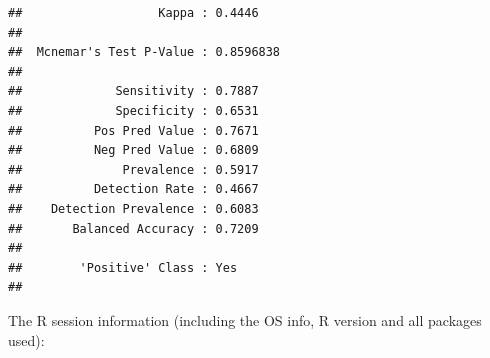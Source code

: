 \documentclass{article}\usepackage[]{graphicx}\usepackage[]{xcolor}
\makeatletter
\newenvironment{kframe}{%
 \def\at@end@of@kframe{}%
 \ifinner\ifhmode%
  \def\at@end@of@kframe{\end{minipage}}%
  \begin{minipage}{\columnwidth}%
 \fi\fi%
 \def\FrameCommand##1{\hskip\@totalleftmargin \hskip-\fboxsep
 \colorbox{shadecolor}{##1}\hskip-\fboxsep
     \hskip-\linewidth \hskip-\@totalleftmargin \hskip\columnwidth}%
 \MakeFramed {\advance\hsize-\width
   \@totalleftmargin\z@ \linewidth\hsize
   \@setminipage}}%
 {\par\unskip\endMakeFramed%
 \at@end@of@kframe}
\newenvironment{knitrout}{}{} %
\makeatother
\begin{document}
\begin{knitrout}
\begin{kframe}
\begin{verbatim}
##                   Kappa : 0.4446          
##                                           
##  Mcnemar's Test P-Value : 0.8596838       
##                                           
##             Sensitivity : 0.7887          
##             Specificity : 0.6531          
##          Pos Pred Value : 0.7671          
##          Neg Pred Value : 0.6809          
##              Prevalence : 0.5917          
##          Detection Rate : 0.4667          
##    Detection Prevalence : 0.6083          
##       Balanced Accuracy : 0.7209          
##                                           
##        'Positive' Class : Yes             
## 
\end{verbatim}
\end{kframe}
\end{knitrout}

The R session information (including the OS info, R version and all
packages used):
\end{document}
